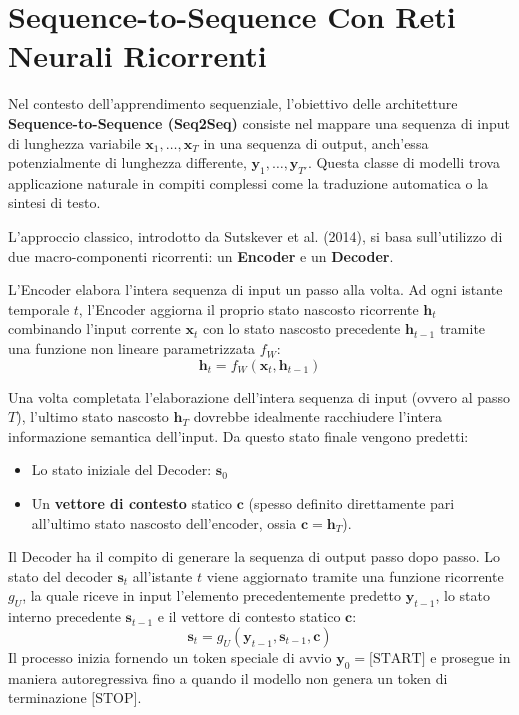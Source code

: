 ﻿\documentclass[11pt, a4paper]{article}
\author{Francesco Lo Verde}
\begin{document}
\section{Sequence-to-Sequence Con Reti Neurali Ricorrenti}

Nel contesto dell'apprendimento sequenziale, l'obiettivo delle architetture \textbf{Sequence-to-Sequence (Seq2Seq)} consiste nel mappare una sequenza di input di lunghezza variabile $\bm{x}_1, \dots, \bm{x}_T$ in una sequenza di output, anch'essa potenzialmente di lunghezza differente, $\bm{y}_1, \dots, \bm{y}_{T'}$. Questa classe di modelli trova applicazione naturale in compiti complessi come la traduzione automatica o la sintesi di testo.

L'approccio classico, introdotto da Sutskever et al. (2014), si basa sull'utilizzo di due macro-componenti ricorrenti: un \textbf{Encoder} e un \textbf{Decoder}.


L'Encoder elabora l'intera sequenza di input un passo alla volta. Ad ogni istante temporale $t$, l'Encoder aggiorna il proprio stato nascosto ricorrente $\bm{h}_t$ combinando l'input corrente $\bm{x}_t$ con lo stato nascosto precedente $\bm{h}_{t-1}$ tramite una funzione non lineare parametrizzata $f_W$:
\[ \bm{h}_t = f_W(\bm{x}_t, \bm{h}_{t-1}) \]

Una volta completata l'elaborazione dell'intera sequenza di input (ovvero al passo $T$), l'ultimo stato nascosto $\bm{h}_T$ dovrebbe idealmente racchiudere l'intera informazione semantica dell'input. Da questo stato finale vengono predetti:
\begin{itemize}
    \item Lo stato iniziale del Decoder: $\bm{s}_0$
    \item Un \textbf{vettore di contesto} statico $\bm{c}$ (spesso definito direttamente pari all'ultimo stato nascosto dell'encoder, ossia $\bm{c} = \bm{h}_T$).
\end{itemize}

Il Decoder ha il compito di generare la sequenza di output passo dopo passo. Lo stato del decoder $\bm{s}_t$ all'istante $t$ viene aggiornato tramite una funzione ricorrente $g_U$, la quale riceve in input l'elemento precedentemente predetto $\bm{y}_{t-1}$, lo stato interno precedente $\bm{s}_{t-1}$ e il vettore di contesto statico $\bm{c}$:
\[ \bm{s}_t = g_U(\bm{y}_{t-1}, \bm{s}_{t-1}, \bm{c}) \]
Il processo inizia fornendo un token speciale di avvio $\bm{y}_0 = \text{[START]}$ e prosegue in maniera autoregressiva fino a quando il modello non genera un token di terminazione $\text{[STOP]}$.
\end{document}
